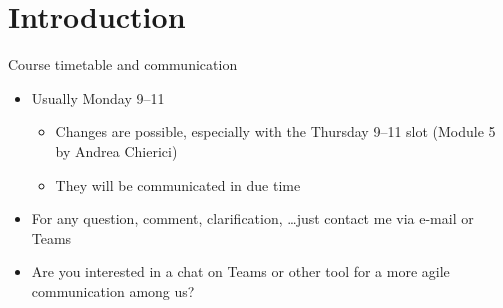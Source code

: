 
\section*{Introduction}

\begin{frame}{Course timetable and communication}
  \begin{itemize}
  \item Usually Monday 9--11

    \begin{itemize}
    \item Changes are possible, especially with the Thursday 9--11 slot (Module 5 by Andrea Chierici)
    \item They will be communicated in due time
    \end{itemize}
  \item For any question, comment, clarification, \ldots just contact me via e-mail or Teams
  \item Are you interested in a chat on Teams or other tool for a more agile
    communication among us?
  \end{itemize}
\end{frame}

